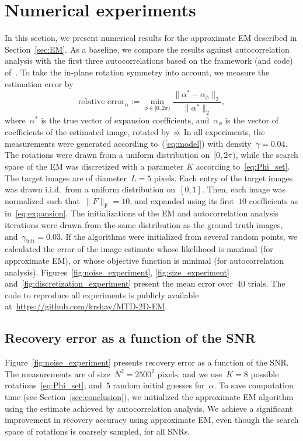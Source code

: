 \documentclass{article}
\begin{document}
\section{Numerical experiments}
\label{sec:numeric}
In this section, we present numerical results for the approximate EM described in Section~\ref{sec:EM}. As a baseline, we compare the results against autocorrelation analysis with the first three autocorrelations based on the framework (and code) of~\cite{marshall2020image, bendory2021multi, kreymer2021two}.
 To take the in-plane rotation symmetry into account, we measure the estimation error by
\begin{equation}
\label{eq:err_z}
\text{relative error}_{\alpha} := \min_{\phi \in [0, 2\pi)} \frac{\|\alpha^* - \alpha_{\phi}\|_2}{\|\alpha^*\|_2},
\end{equation}
where~$\alpha^*$ is the true vector of expansion coefficients, and~$\alpha_{\phi}$ is the vector of coefficients of the estimated image, rotated by~$\phi$. In all experiments, the measurements were generated according to~(\ref{eq:model}) with density~\mbox{$\gamma = 0.04$}. The rotations  were drawn from a uniform distribution on~$[0, 2\pi)$, while the search space of the EM was discretized with a parameter $K$ according to~\eqref{eq:Phi_set}. The target images are of diameter~\mbox{$L = 5 \text{ pixels}$}. Each entry of the target images was drawn i.i.d.\ from a uniform distribution on~$[0,1]$. Then, each image was normalized such that~\mbox{$\|F\|_\text{F} = 10$}, and expanded using its first~$10$ coefficients as in~\eqref{eq:expansion}. The initializations of the EM and autocorrelation analysis iterations were drawn from the same distribution as the ground truth images, and~\mbox{$\gamma_{\text{init}} = 0.03$}. If the algorithms were initialized from several random  points, we calculated the  error of the image estimate whose likelihood is maximal (for approximate EM), or  whose objective function is minimal (for autocorrelation analysis). Figures~\ref{fig:noise_experiment}, \ref{fig:size_experiment} and~\ref{fig:discretization_experiment} present the mean error over~$40$ trials. The code to reproduce all experiments is publicly available at~\url{https://github.com/krshay/MTD-2D-EM}.

\subsection{Recovery error as a function of the SNR}
\label{subsec:exp_SNR}
Figure~\ref{fig:noise_experiment} presents recovery error as a function of the SNR. The measurements are of size~\mbox{$N^2 = 2500^2 \text{ pixels}$}, and we use~\mbox{$K = 8$} possible rotations~\eqref{eq:Phi_set}, and~$5$ random initial guesses for~$\alpha$.
To save computation time (see Section~\ref{sec:conclusion}), we initialized the approximate EM algorithm using the estimate achieved by autocorrelation analysis. We achieve a significant improvement in recovery accuracy using approximate EM, even though the search space of rotations is coarsely sampled, for all SNRs.
\end{document}
